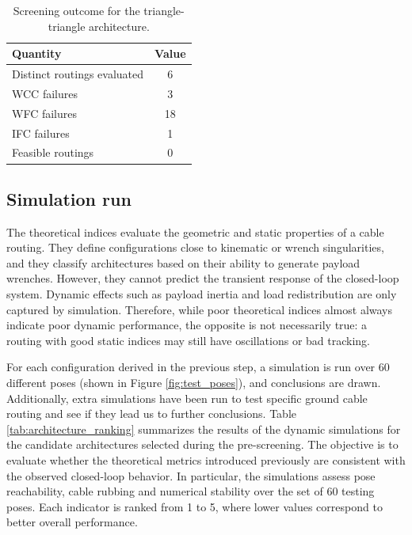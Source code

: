 \begin{table}[ht]
\centering
\begin{tabular}{lc}
\toprule
\textbf{Quantity} & \textbf{Value} \\
\midrule
Distinct routings evaluated & 6 \\
WCC failures & 3 \\
WFC failures & 18 \\
IFC failures & 1 \\
Feasible routings & 0 \\
\bottomrule
\end{tabular}
\caption{Screening outcome for the triangle-triangle architecture.}
\label{tab:triangleTriangleScreening}
\end{table}



\subsection{Simulation run}
The theoretical indices evaluate the geometric and static properties of a cable routing. They define configurations close to kinematic or wrench singularities, and they classify architectures based on their ability to generate payload wrenches. However, they cannot predict the transient response of the closed-loop system. Dynamic effects such as payload inertia and load redistribution are only captured by simulation. Therefore, while poor theoretical indices almost always indicate poor dynamic performance, the opposite is not necessarily true: a routing with good static indices may still have oscillations or bad tracking.

For each configuration derived in the previous step, a simulation is run over 60 different poses (shown in Figure \ref{fig:test_poses}), and conclusions are drawn. Additionally, extra simulations have been run to test specific ground cable routing and see if they lead us to further conclusions. Table \ref{tab:architecture_ranking} summarizes the results of the dynamic simulations for the candidate architectures selected during the pre-screening. The objective is to evaluate whether the theoretical metrics introduced previously are consistent with the observed closed-loop behavior. In particular, the simulations assess pose reachability, cable rubbing and numerical stability over the set of 60 testing poses. Each indicator is ranked from 1 to 5, where lower values correspond to better overall performance.


